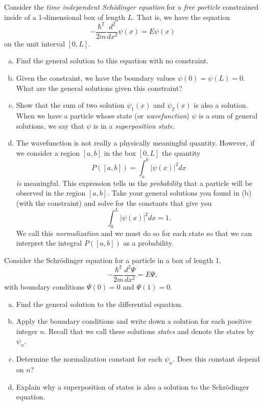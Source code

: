 \begin{problem}
Consider the \emph{time independent Sch\"odinger equation} for a \emph{free particle} constrained inside of a 1-dimensional box of length $L$. That is, we have the equation
\[
-\frac{\hbar^2}{2m}\frac{d^2}{dx^2}\psi(x)=E\psi(x)
\]
on the unit interval $[0,L]$.
\begin{enumerate}[(a)]
    \item Find the general solution to this equation with no constraint.
    \item Given the constraint, we have the boundary values $\psi(0)=\psi(L)=0$. What are the general solutions given this constraint?
    \item Show that the sum of two solution $\psi_1(x)$ and $\psi_2(x)$ is also a solution. When we have a particle whose state (or \emph{wavefunction}) $\psi$ is a sum of general solutions, we say that $\psi$ is in a \emph{superposition state.}
    \item The wavefunction is not really a physically meaningful quantity.  However, if we consider a region $[a,b]$ in the box $[0,L]$ the quantity
    \[
    P([a,b])=\int_a^b |\psi(x)|^2dx
    \]
    \emph{is} meaningful. This expression tells us the \emph{probability} that a particle will be observed in the region $[a,b]$.  Take your general solutions you found in (b) (with the constraint) and solve for the constants that give you
    \[
    \int_0^L |\psi(x)|^2dx=1.
    \]
    We call this \emph{normalization} and we must do so for each state so that we can interpret the integral $P([a,b])$ as a probability.
\end{enumerate}
\end{problem}

\begin{problem}
Consider the Schr\"odinger equation for a particle in a box of length 1,
\[
-\frac{\hbar^2}{2m}\frac{d^2 \Psi}{dx^2} = E\Psi,
\]
with boundary conditions $\Psi(0)=0$ and $\Psi(1)=0$.
\begin{enumerate}[(a)]
    \item Find the general solution to the differential equation.
    \item Apply the boundary conditions and write down a solution for each positive integer $n$. Recall that we call these solutions \emph{states} and denote the states by $\psi_n$.
    \item Determine the normalization constant for each $\psi_n$.  Does this constant depend on $n$?
    \item Explain why a superposition of states is also a solution to the Schr\"odinger equation.
\end{enumerate}
\end{problem}

